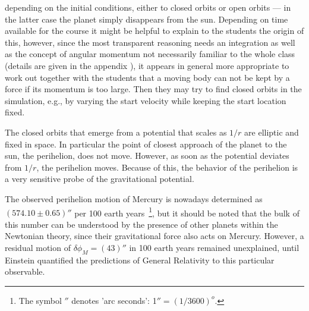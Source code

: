 \documentclass[12pt]{iopart}
\begin{document}
%
 depending on the initial conditions, either to closed orbits or open orbits --- in the latter case the planet simply disappears from the sun.
Depending on time available for the course  it might be helpful to explain to the students the origin of this, however, since the most transparent reasoning needs an integration as well as the concept of angular momentum not necessarily familiar to the whole class (details are given in the appendix 
%
%
), 
it appears in general more appropriate to work out together with the students that a moving body can not be kept by a force if its momentum is too large.
Then they may try to find closed orbits in the simulation, e.g., by varying the start velocity while keeping the start location fixed.

The closed orbits that emerge from a potential that scales as $1/r$ are elliptic and fixed in space.
In particular the point of closest approach of the planet to the sun, the perihelion, does not move.
However, as soon as the potential deviates from $1/r$, the perihelion moves. Because of this, the behavior of the perihelion
is a very sensitive probe of the gravitational potential. 

The observed perihelion motion of Mercury is nowadays determined as $(574.10\pm 0.65)''$ per
100 earth years~\footnote{The symbol $''$ denotes 'arc seconds': 1$''=(1/3600)^o$. }, but it should be noted that the bulk of this number
can be understood by the presence of other planets within the Newtonian theory, since
their gravitational force also acts on Mercury. However, a
residual motion of $\delta \phi_M = (43)''$ in 100 earth years remained unexplained, until Einstein quantified the
predictions of General Relativity to this particular observable. 

%
%
\end{document}
